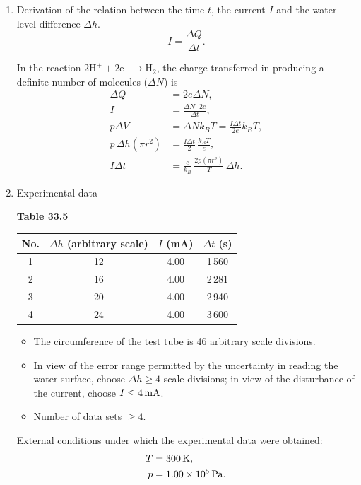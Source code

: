 \begin{enumerate}[label=(\arabic*)]
\item Derivation of the relation between the time $t$, the current $I$ and the water-level difference $\Delta h$.
\begin{equation*}
I = \frac{\Delta Q}{\Delta t}.
\end{equation*}

In the reaction $2\mathrm{H^+} + 2\mathrm{e^-} \longrightarrow \mathrm{H_2}$, the charge transferred in producing a definite number of molecules ($\Delta N$) is
\begin{align*}
\Delta Q &= 2e\Delta N,\\
I &= \frac{\Delta N\cdot 2e}{\Delta t},\\
p\Delta V &= \Delta N k_B T = \frac{I\Delta t}{2e}k_B T,\\
p\,\Delta h(\pi r^2) &= \frac{I\Delta t}{2}\,\frac{k_B T}{e},\\
I\Delta t &= \frac{e}{k_B}\,\frac{2p(\pi r^2)}{T}\,\Delta h.
\end{align*}

\item Experimental data

\begin{center}
\small\textbf{Table 33.5}
\end{center}
\begin{center}
\begin{tabular}{cccc}
\toprule
No. & $\Delta h$ (arbitrary scale) & $I$ (mA) & $\Delta t$ (s) \\
\midrule
1 & 12 & 4.00 & 1\,560 \\
2 & 16 & 4.00 & 2\,281 \\
3 & 20 & 4.00 & 2\,940 \\
4 & 24 & 4.00 & 3\,600 \\
\bottomrule
\end{tabular}
\end{center}

\begin{itemize}
\item The circumference of the test tube is 46 arbitrary scale divisions.
\item In view of the error range permitted by the uncertainty in reading the water surface, choose $\Delta h \ge 4$ scale divisions; in view of the disturbance of the current, choose $I \le 4\,\mathrm{mA}$.
\item Number of data sets $\ge 4$.
\end{itemize}

External conditions under which the experimental data were obtained:
\begin{align*}
T &= 300\,\mathrm{K},\\
p &= 1.00\times10^{5}\,\mathrm{Pa}.
\end{align*}


\end{enumerate}
